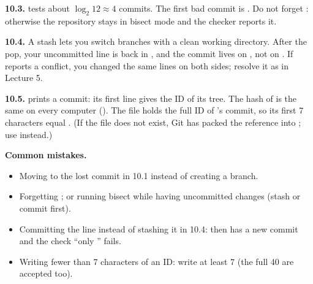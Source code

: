 \textbf{10.3.}  tests about $\log_2 12 \approx 4$ commits. The first bad commit is . Do not forget : otherwise the repository stays in bisect mode and the checker reports it.

\textbf{10.4.} A stash lets you switch branches with a clean working directory. After the pop, your uncommitted line is back in , and the commit  lives on , not on . If  reports a conflict, you changed the same lines on both sides; resolve it as in Lecture 5.

\textbf{10.5.}  prints a commit: its first line gives the ID of its tree. The hash of  is the same on every computer (). The file  holds the full ID of 's commit, so its first 7 characters equal . (If the file does not exist, Git has packed the reference into ; use  instead.)

\textbf{Common mistakes.}
\begin{itemize}
  \item Moving  to the lost commit in 10.1 instead of creating a branch.
  \item Forgetting ; or running bisect while having uncommitted changes (stash or commit first).
  \item Committing the  line instead of stashing it in 10.4: then  has a new commit and the check ``only '' fails.
  \item Writing fewer than 7 characters of an ID: write at least 7 (the full 40 are accepted too).
\end{itemize}
